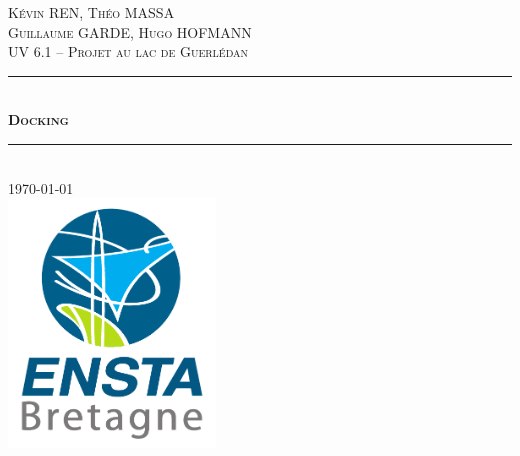 \begin{titlepage}

\newcommand{\HRule}{\rule{\linewidth}{0.5mm}} %

\center %
 

\vspace{3cm}
\textsc{\LARGE Kévin REN,  Théo MASSA \\[0.5cm] Guillaume GARDE, Hugo HOFMANN } \\ [1.5cm]
\textsc{\Large UV 6.1 -- Projet au lac de Guerlédan}\\[1.5cm]

\HRule \\[0.4cm]
{ \huge \bfseries \textsc{Docking\\[0.3cm]}}
\HRule \\[.5cm]


\vspace{1cm}
{\huge \today}\\[1cm] %

\vspace{2cm}
\includegraphics[width = 5.5cm]{logo.pdf}\\[1cm] %
 

\vfill %

\end{titlepage}